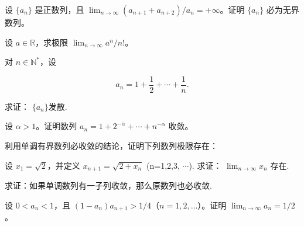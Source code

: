 \noindent\begin{minipage}{\textwidth}
设 $\{a_n\}$ 是正数列，且 $\lim_{n\to\infty}(a_{n+1}+a_{n+2})/a_n=+\infty$。证明 $\{a_n\}$ 必为无界数列。
\end{minipage}\par\vfill
\newpage
\noindent\begin{minipage}{\textwidth}
设 $a\in\mathbb R$，求极限 $\lim_{n\to\infty}a^n/n!$。
\end{minipage}\par\vfill
\noindent\begin{minipage}{\textwidth}
对  $ n \in \mathbb{N}^* $，设

\[a_{n}=1+\frac{1}{2}+\cdots+\frac{1}{n}.\]

求证： $ \{a_{n}\} $发散.
\end{minipage}\par\vfill
\noindent\begin{minipage}{\textwidth}
设 $\alpha>1$。证明数列 $a_n=1+2^{-\alpha}+\cdots+n^{-\alpha}$ 收敛。
\end{minipage}\par\vfill
\newpage
\noindent\begin{minipage}{\textwidth}
利用单调有界数列必收敛的结论，证明下列数列极限存在：
\end{minipage}\par\vfill
\noindent\begin{minipage}{\textwidth}
设  $ x_{1}=\sqrt{2} $，并定义  $ x_{n+1}=\sqrt{2+x_{n}} $ (n=1,2,3, $ \cdots $). 求证： $ \lim_{n\to\infty}x_{n} $ 存在.
\end{minipage}\par\vfill
\noindent\begin{minipage}{\textwidth}
求证：如果单调数列有一子列收敛，那么原数列也必收敛.
\end{minipage}\par\vfill
\newpage
\noindent\begin{minipage}{\textwidth}
设 $0<a_n<1$，且 $(1-a_n)a_{n+1}>1/4$（$n=1,2,\ldots$）。证明 $\lim_{n\to\infty}a_n=1/2$。
\end{minipage}\par\vfill
